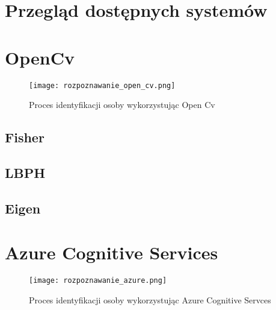 \section{Przegląd dostępnych systemów}
\section{OpenCv}
\begin{figure}[H]
	\centering
	\texttt{[image: rozpoznawanie\_open\_cv.png]}
	\caption{Proces identyfikacji osoby wykorzystując Open Cv}
	\label{fig:rozpoznawanie_open_cv}
\end{figure}
\subsection{Fisher}
\subsection{LBPH}
\subsection{Eigen}
\section{Azure Cognitive Services}
\begin{figure}[H]
	\centering
	\texttt{[image: rozpoznawanie\_azure.png]}
	\caption{Proces identyfikacji osoby wykorzystując Azure Cognitive Servces}
	\label{fig:rozpoznawanie_open_cv}
\end{figure}